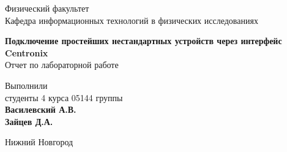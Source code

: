 

\makeatletter
\begin{titlepage}
	
	\newpage
	
    \noindent{}
    
	\vspace*{50pt}
    
	Физический факультет \\[\baselineskip]
    
	Кафедра информационных технологий в физических исследованиях

	\vspace*{100pt}

	{\Large\textbf{Подключение простейших нестандартных устройств через интерфейс Centronix}} \\[\baselineskip]

	Отчет по лабораторной работе

	\vspace*{\fill}

	\hfill\begin{minipage}{15em}
    	Выполнили\\
		студенты 4 курса 05144 группы\\
		\textbf{Василевский А.В.}\\
		\textbf{Зайцев Д.А.}
    \end{minipage}
    
	
    
	\vspace*{\fill}
    
	Нижний Новгород\par
    
	
\end{titlepage}
\makeatother